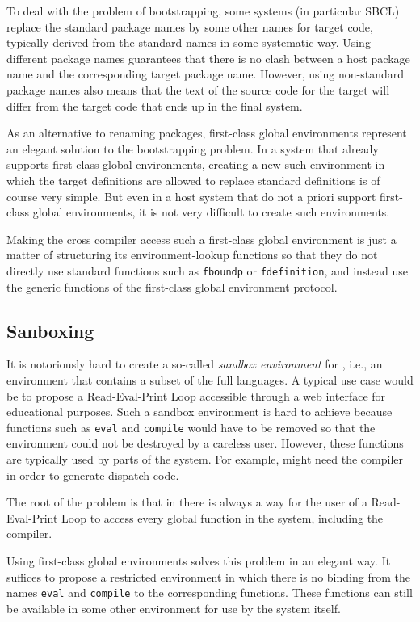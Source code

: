 To deal with the problem of bootstrapping, some systems (in particular
SBCL)%
replace the standard package names by some other names for target
code, typically derived from the standard names in some systematic
way.  Using different package names guarantees that there is no clash
between a host package name and the corresponding target package
name.  However, using non-standard package names also means that the
text of the source code for the target will differ from the target
code that ends up in the final system.

As an alternative to renaming packages, first-class global
environments represent an elegant solution to the bootstrapping
problem.  In a system that already supports first-class global
environments, creating a new such environment in which the target
definitions are allowed to replace standard \commonlisp{} definitions
is of course very simple.  But even in a host system that do not a
priori support first-class global environments, it is not very
difficult to create such environments.

Making the cross compiler access such a first-class global environment
is just a matter of structuring its environment-lookup functions so
that they do not directly use standard \commonlisp{} functions such as
\texttt{fboundp} or \texttt{fdefinition}, and instead use the generic
functions of the first-class global environment protocol.

\subsection{Sanboxing}

It is notoriously hard to create a so-called \emph{sandbox
  environment} for \commonlisp{}, i.e., an environment that contains
a subset of the full languages.  A typical use case would be to
propose a Read-Eval-Print Loop accessible through a web interface for
educational purposes.  Such a sandbox environment is hard to achieve
because functions such as \texttt{eval} and \texttt{compile} would
have to be removed so that the environment could not be destroyed by a
careless user.  However, these functions are typically used by parts
of the system.  For example, \clos{} might need the compiler in order
to generate dispatch code.

The root of the problem is that in \commonlisp{} there is always a way
for the user of a Read-Eval-Print Loop to access every global function
in the system, including the compiler.

Using first-class global environments solves this problem in an
elegant way.  It suffices to propose a restricted environment in which
there is no binding from the names \texttt{eval} and \texttt{compile}
to the corresponding functions.  These functions can still be
available in some other environment for use by the system itself.

